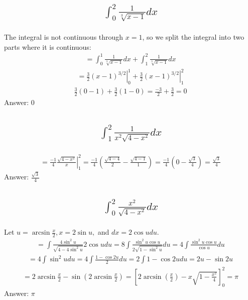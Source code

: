 \documentclass{article}
\begin{document}
\subsection{
	\begin{align*}
		\int_0^2{\frac{1}{\sqrt[3]{x - 1}} dx}
	\end{align*}
}
The integral is not continuous through $x = 1$, so we split the integral into two parts where it is continuous:
\begin{align*}
	= \int_0^1{\frac{1}{\sqrt[3]{x - 1}} dx} + \int_1^2{\frac{1}{\sqrt[3]{x - 1}} dx}
\end{align*}
\begin{align*}
	\left. = \frac{3}{2} (x - 1)^{3/2} \right|_0^1 + \left. \frac{3}{2} (x - 1)^{3/2} \right|_1^2
\end{align*}
\begin{align*}
	\frac{3}{2}\left( 0 - 1 \right) + \frac{3}{2}\left(1 - 0 \right) = \frac{-3}{2} + \frac{3}{2} = 0
\end{align*}
Answer: 0

\subsection{
	\begin{align*}
		\int_1^2{\frac{1}{x^2 \sqrt{4 - x^2}} dx}
	\end{align*}
}
\begin{align*}
	\left. = \frac{-1}{4} \frac{\sqrt{4 - x^2}}{x} \right|_1^2 = \frac{-1}{4} \left( \frac{\sqrt{4-4}}{2} - \frac{\sqrt{4 - 1}}{1} \right) = \frac{-1}{4} \left( 0 - \frac{\sqrt{3}}{4} \right) = \frac{\sqrt{3}}{4}
\end{align*}
Answer: $\frac{\sqrt{3}}{4}$

\subsection{
	\begin{align*}
		\int_0^2{\frac{x^2}{\sqrt{4 - x^2}} dx}
	\end{align*}
}
Let $u = \arcsin{\frac{x}{2}}, x = 2\sin{u},$ and $dx = 2\cos{u}du$.
\begin{align*}
	= \int{\frac{4\sin^2{u}}{\sqrt{4 - 4\sin^2{u}}}2\cos{u}du} = 8\int{\frac{\sin^2{u}\cos{u}}{2\sqrt{1 - \sin^2{u}}}du} = 4\int{\frac{\sin^2{u}\cos{u}}{\cos{u}}du}
\end{align*}
\begin{align*}
	= 4\int{\sin^2{u}du} = 4\int{\frac{1 - \cos{2u}}{2}du} = 2\int{1 - \cos{2u}du} = 2u - \sin{2u}
\end{align*}
\begin{align*}
	= 2\arcsin{\frac{x}{2}} -\sin{(2\arcsin{\frac{x}{2}})}= \left[ 2\arcsin{(\frac{x}{2})} - x\sqrt{1 - \frac{x^2}{4}} \right]_0^2 = \pi
\end{align*}
Answer: $\pi$
\end{document}
